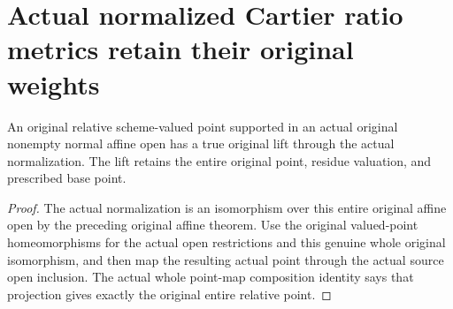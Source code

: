 \section{Actual normalized Cartier ratio metrics retain their original weights}

\begin{definition}
\label{def:actual-normalization-relative-point-lift}
\leanok
{}
An original relative scheme-valued point supported in an actual
original nonempty normal affine open has a true original lift
through the actual normalization. The lift retains the entire
original point, residue valuation, and prescribed base point.
\end{definition}
\begin{proof}
The actual normalization is an isomorphism over this entire
original affine open by the preceding original affine theorem.
Use the original valued-point homeomorphisms for the actual open
restrictions and this genuine whole original isomorphism, and then
map the resulting actual point through the actual source open
inclusion. The actual whole point-map composition identity says
that projection gives exactly the original entire relative point.
\end{proof}

